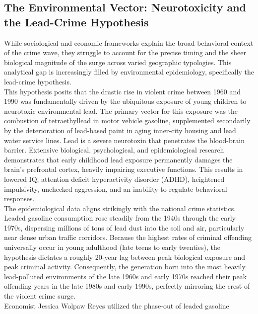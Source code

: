 \documentclass[
]{article}
\begin{document}
\subsection{\texorpdfstring{\textbf{The Environmental Vector:
Neurotoxicity and the Lead-Crime
Hypothesis}}{The Environmental Vector: Neurotoxicity and the Lead-Crime Hypothesis}}\label{the-environmental-vector-neurotoxicity-and-the-lead-crime-hypothesis}

While sociological and economic frameworks explain the broad behavioral
context of the crime wave, they struggle to account for the precise
timing and the sheer biological magnitude of the surge across varied
geographic typologies. This analytical gap is increasingly filled by
environmental epidemiology, specifically the lead-crime hypothesis.\\
This hypothesis posits that the drastic rise in violent crime between
1960 and 1990 was fundamentally driven by the ubiquitous exposure of
young children to neurotoxic environmental lead. The primary vector for
this exposure was the combustion of tetraethyllead in motor vehicle
gasoline, supplemented secondarily by the deterioration of lead-based
paint in aging inner-city housing and lead water service lines. Lead is
a severe neurotoxin that penetrates the blood-brain barrier. Extensive
biological, psychological, and epidemiological research demonstrates
that early childhood lead exposure permanently damages the brain's
prefrontal cortex, heavily impairing executive functions. This results
in lowered IQ, attention deficit hyperactivity disorder (ADHD),
heightened impulsivity, unchecked aggression, and an inability to
regulate behavioral responses.\\
The epidemiological data aligns strikingly with the national crime
statistics. Leaded gasoline consumption rose steadily from the 1940s
through the early 1970s, dispersing millions of tons of lead dust into
the soil and air, particularly near dense urban traffic corridors.
Because the highest rates of criminal offending universally occur in
young adulthood (late teens to early twenties), the hypothesis dictates
a roughly 20-year lag between peak biological exposure and peak criminal
activity. Consequently, the generation born into the most heavily
lead-polluted environments of the late 1960s and early 1970s reached
their peak offending years in the late 1980s and early 1990s, perfectly
mirroring the crest of the violent crime surge.\\
Economist Jessica Wolpaw Reyes utilized the phase-out of leaded gasoline
\end{document}
